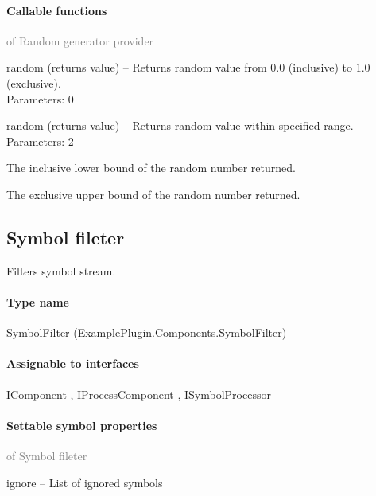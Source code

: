 	\paragraph{Callable functions}\textcolor{gray}{of Random generator provider}
	\begin{description*}
		\item[random]
		(returns value)
			-- Returns random value from 0.0 (inclusive) to 1.0 (exclusive).
		\\ Parameters: 0
		\item[random]
		(returns value)
			-- Returns random value within specified range.
		\\ Parameters: 2
			\begin{enumerate*}
				\item The inclusive lower bound of the random number returned.
				\item             The exclusive upper bound of the random number returned.
			\end{enumerate*}
	\end{description*}
	


\subsection{Symbol fileter}
\label{ExamplePlugin.Components.SymbolFilter}
Filters symbol stream.\paragraph{Type name}
SymbolFilter (ExamplePlugin.Components.SymbolFilter) 	\paragraph{Assignable to interfaces}
		\hyperref[Malsys.Processing.Components.IComponent]{IComponent}%
, 		\hyperref[Malsys.Processing.Components.IProcessComponent]{IProcessComponent}%
, 		\hyperref[Malsys.Processing.Components.ISymbolProcessor]{ISymbolProcessor}%
	\paragraph{Settable symbol properties}\textcolor{gray}{of Symbol fileter}
	\begin{description*}
		\item[ignore]
			-- List of ignored symbols
	\end{description*}
